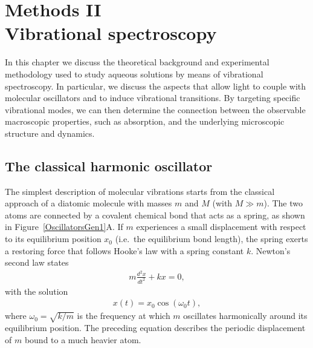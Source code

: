 \chapter[Methods II: Vibrational spectroscopy]{Methods II\\Vibrational spectroscopy}
\label{chap:TRVS}
\label{ChapterTRVS}
\label{Chapter3}

\vspace{30pt}
	
	
In this chapter we discuss the theoretical background and experimental methodology used to study aqueous solutions by means of vibrational spectroscopy. In particular, we discuss the aspects that allow light to couple with molecular oscillators and to induce vibrational transitions. By targeting specific vibrational modes, we can then determine the connection between the observable macroscopic properties, such as absorption, and the underlying microscopic structure and dynamics.


\newpage	
	
\section{The classical harmonic oscillator}
	
The simplest description of molecular vibrations starts from the classical approach of a diatomic molecule with masses $m$ and $M$ (with $M \gg m$). The two atoms are connected by a covalent chemical bond that acts as a spring, as shown in Figure~\ref{OscillatorsGen1}A. If $m$ experiences a small displacement with respect to its equilibrium position $x_0$ (i.e.\ the equilibrium bond length), the spring exerts a restoring force that follows Hooke's law with a spring constant $k$. Newton's second law states
\begin{eqnarray}
m \frac{d^2 x}{d t^2} + k x = 0,
\end{eqnarray}
with the solution 
\begin{eqnarray}
x (t) = x_0 \cos (\omega_0 t),
\end{eqnarray}
where $\omega_0 = \sqrt{k/m}$ is the frequency at which $m$ oscillates harmonically around its equilibrium position. The preceding equation describes the periodic displacement of $m$ bound to a much heavier atom.

